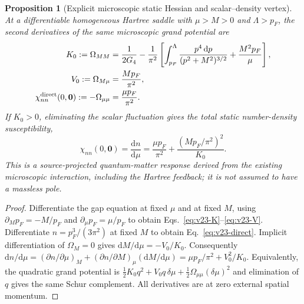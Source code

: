 \documentclass[11pt,a4paper]{article}
\newtheorem{proposition}[theorem]{Proposition}
\theoremstyle{remark}\newtheorem{remark}[theorem]{Remark}
\newcommand{\dd}{\mathrm d}\newcommand{\Tr}{\operatorname{Tr}}\newcommand{\cO}{\mathcal O}\newcommand{\cG}{\mathcal G}\newcommand{\cH}{\mathcal H}\newcommand{\cE}{\mathcal E}\newcommand{\cK}{\mathcal K}\newcommand{\AX}{\textsf{[AXIOM]}}\newcommand{\D}{\textsf{[DERIVED]}}\newcommand{\C}{\textsf{[CONDITIONAL]}}\newcommand{\OPEN}{\textsf{[OPEN]}}
\begin{document}
\begin{proposition}[Explicit microscopic static Hessian and scalar--density vertex]\label{prop:v23-hartree}
At a differentiable homogeneous Hartree saddle with $\mu>M>0$ and $\Lambda>p_F$, the second derivatives of the \emph{same} microscopic grand potential are
\begin{align}
K_0:=\Omega_{MM}&=\frac1{2G_4}-\frac1{\pi^2}\left[\int_{p_F}^{\Lambda}\frac{p^4\,\dd p}{(p^2+M^2)^{3/2}}+\frac{M^2p_F}{\mu}\right],\label{eq:v23-K}\\
V_0:=\Omega_{M\mu}&=\frac{Mp_F}{\pi^2},\label{eq:v23-V}\\
\chi_{nn}^{\rm direct}(0,\bm0):=-\Omega_{\mu\mu}&=\frac{\mu p_F}{\pi^2}.\label{eq:v23-direct}
\end{align}
If $K_0>0$, eliminating the scalar fluctuation gives the \emph{total} static number-density susceptibility,
\begin{equation}\label{eq:v23-chi}
\boxed{\chi_{nn}(0,\bm0)=\frac{\dd n}{\dd\mu}=\frac{\mu p_F}{\pi^2}+\frac{(Mp_F/\pi^2)^2}{K_0}.}
\end{equation}
This is a source-projected quantum-matter response derived from the existing microscopic interaction, including the Hartree feedback; it is \emph{not} assumed to have a massless pole.
\end{proposition}
\begin{proof}
Differentiate the gap equation at fixed $\mu$ and at fixed $M$, using $\partial_Mp_F=-M/p_F$ and $\partial_\mu p_F=\mu/p_F$ to obtain Eqs.~\eqref{eq:v23-K}--\eqref{eq:v23-V}. Differentiate $n=p_F^3/(3\pi^2)$ at fixed $M$ to obtain Eq.~\eqref{eq:v23-direct}. Implicit differentiation of $\Omega_M=0$ gives $\dd M/\dd\mu=-V_0/K_0$. Consequently $\dd n/\dd\mu=(\partial n/\partial\mu)_M+(\partial n/\partial M)_\mu(\dd M/\dd\mu)=\mu p_F/\pi^2+V_0^2/K_0$. Equivalently, the quadratic grand potential is $\tfrac12 K_0q^2+V_0q\,\delta\mu+\tfrac12\Omega_{\mu\mu}(\delta\mu)^2$ and elimination of $q$ gives the same Schur complement. All derivatives are at zero external spatial momentum.
\end{proof}
\end{document}
